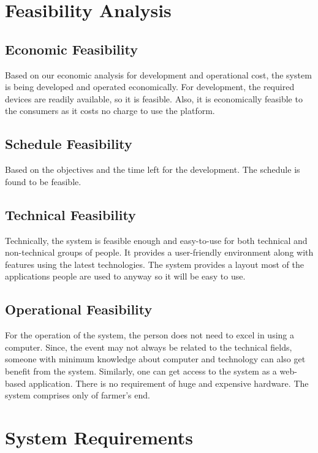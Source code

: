 \section{Feasibility Analysis}

\subsection{Economic Feasibility}
Based on our economic analysis for development and operational cost, 
the system is being developed and operated economically. For development, 
the required devices are readily available, so it is feasible. Also, 
it is economically feasible to the consumers as it costs no charge to use the platform.

\subsection{Schedule Feasibility}
Based on the objectives and the time left for the development. 
The schedule is found to be feasible.

\subsection{Technical Feasibility}
Technically, the system is feasible enough and easy-to-use 
for both technical and non-technical groups of people. It provides 
a user-friendly environment along with features using the latest technologies. 
The system provides a layout most of the applications people are used to anyway 
so it will be easy to use.

\subsection{Operational Feasibility}
For the operation of the system, the person does 
not need to excel in using a computer. Since, the event 
may not always be related to the technical fields, someone 
with minimum knowledge about computer and technology can also get 
benefit from the system. Similarly, one can get access to the system 
as a web-based application. There is no requirement of huge and expensive hardware. 
The system comprises only of farmer’s end. 

\section{System Requirements}

